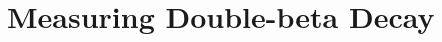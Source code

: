 \documentclass[herrin-thesis.tex]{subfiles}
\begin{document}
\chapter{Measuring Double-beta Decay}
\label{ch:analysis}
\end{document}
